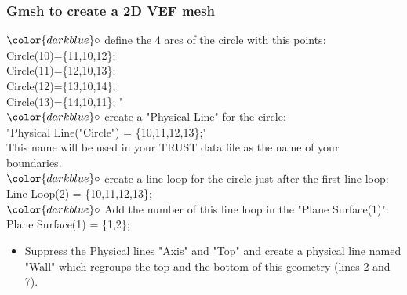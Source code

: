 \documentclass[10pt, hyperref={unicode=true,pdfusetitle, bookmarks=true,bookmarksnumbered=false,bookmarksopen=false, breaklinks=false,pdfborder={0 0 1},backref=true,colorlinks=true,linkcolor=darkblue,pageanchor}]{beamer}
\begin{document}
\begin{frame}
\frametitle{Gmsh to create a 2D VEF mesh}
\begin{block}{}

\hspace{1cm} $\color{darkblue}\circ$ {\small{ define the 4 arcs of the circle with this points: \\
\hspace{1.4cm} Circle(10)=\{11,10,12\};\\
\hspace{1.4cm} Circle(11)=\{12,10,13\};\\
\hspace{1.4cm} Circle(12)=\{13,10,14\};\\
\hspace{1.4cm} Circle(13)=\{14,10,11\}; "}}\\
\hspace{1cm} $\color{darkblue}\circ$ {\small{ create a "Physical Line" for the circle: \\
\hspace{1.4cm} "Physical Line("Circle") = \{10,11,12,13\};"\\
\hspace{1.4cm} This name will be used in your TRUST data file as the name of your \\
\hspace{1.4cm} boundaries.}}\\
\hspace{1cm} $\color{darkblue}\circ$ {\small{create a line loop for the circle just after the first line loop:\\
\hspace{1.4cm} Line Loop(2) = \{10,11,12,13\}; \\}}
\hspace{1cm} $\color{darkblue}\circ$ {\small{Add the number of this line loop in the "Plane Surface(1)":\\
\hspace{1.4cm} Plane Surface(1) = \{1,2\}; }}


\begin{itemize}
\item Suppress the Physical lines "Axis" and "Top" and create a physical line named "Wall" which regroups the top and the bottom of this geometry (lines 2 and 7).
\end{itemize}

\end{block}
\end{frame}
\end{document}
